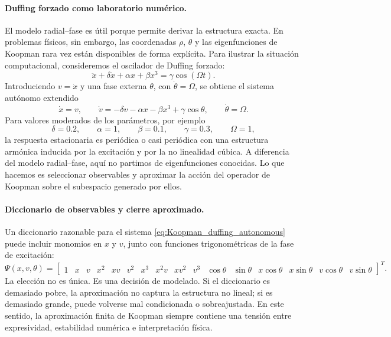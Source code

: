 \paragraph{Duffing forzado como laboratorio numérico.}
El modelo radial--fase es útil porque permite derivar la estructura exacta. En problemas físicos, sin embargo, las coordenadas \(\rho\), \(\theta\) y las eigenfunciones de Koopman rara vez están disponibles de forma explícita. Para ilustrar la situación computacional, consideremos el oscilador de Duffing forzado:
\begin{equation}
\ddot{x}+\delta\dot{x}+\alpha x+\beta x^3=\gamma\cos(\Omega t).
\label{eq:Koopman_duffing_forced_second_order}
\end{equation}
Introduciendo \(v=\dot{x}\) y una fase externa \(\theta\), con \(\dot{\theta}=\Omega\), se obtiene el sistema autónomo extendido
\begin{equation}
\dot{x}=v,
\qquad
\dot{v}=-\delta v-\alpha x-\beta x^3+\gamma\cos\theta,
\qquad
\dot{\theta}=\Omega.
\label{eq:Koopman_duffing_autonomous}
\end{equation}
Para valores moderados de los parámetros, por ejemplo
\begin{equation}
\delta=0.2,
\qquad
\alpha=1,
\qquad
\beta=0.1,
\qquad
\gamma=0.3,
\qquad
\Omega=1,
\label{eq:Koopman_duffing_parameters}
\end{equation}
la respuesta estacionaria es periódica o casi periódica con una estructura armónica inducida por la excitación y por la no linealidad cúbica. A diferencia del modelo radial--fase, aquí no partimos de eigenfunciones conocidas. Lo que hacemos es seleccionar observables y aproximar la acción del operador de Koopman sobre el subespacio generado por ellos.

\paragraph{Diccionario de observables y cierre aproximado.}
Un diccionario razonable para el sistema \eqref{eq:Koopman_duffing_autonomous} puede incluir monomios en \(x\) y \(v\), junto con funciones trigonométricas de la fase de excitación:
\begin{equation}
\Psi(x,v,\theta)=
\begin{bmatrix}
1 & x & v & x^2 & xv & v^2 & x^3 & x^2v & xv^2 & v^3 &
\cos\theta & \sin\theta & x\cos\theta & x\sin\theta & v\cos\theta & v\sin\theta
\end{bmatrix}^{T}.
\label{eq:Koopman_duffing_dictionary}
\end{equation}
La elección no es única. Es una decisión de modelado. Si el diccionario es demasiado pobre, la aproximación no captura la estructura no lineal; si es demasiado grande, puede volverse mal condicionada o sobreajustada. En este sentido, la aproximación finita de Koopman siempre contiene una tensión entre expresividad, estabilidad numérica e interpretación física.

